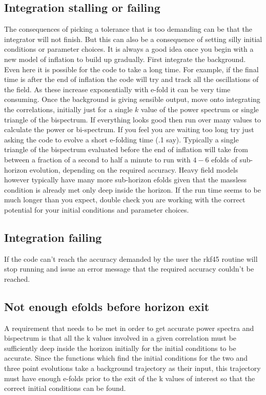 \documentclass[10pt,
amsmath,amssymb,
aps,prd,nofootinbib,eqsecnum,a4paper]{revtex4}
\begin{document}
\subsection{Integration stalling or failing} 

The consequences of picking a tolerance that is too demanding can be that the integrator will not finish. 
But this can also be a consequence of setting silly initial conditions or parameter choices. It is always a good idea 
once you begin with a new model of inflation to build up gradually. First integrate the background. Even here it 
is possible for the code to take a long time. For example, if the final time is after the end of inflation the code will 
try and  track all the oscillations of the field. As these increase exponentially with e-fold it 
can be very time consuming. 
Once the background is giving sensible output, move onto integrating the correlations, 
initially just for a 
single $k$ value of the power spectrum or single triangle of the bispectrum. If 
everything looks good then run over many values to calculate the power or bi-spectrum. If you feel you are waiting too long try just asking 
the code to evolve 
a short e-folding time (.1 say). Typically a single triangle of the bispectrum evaluated before the end of 
inflation will take 
from between a fraction of a second to half a minute to run with $4-6$ efolds of 
sub-horizon evolution, depending on the required accuracy. Heavy field models however typically have many more sub-horizon efolds given that the massless condition is already met only deep inside the horizon.  If the run time seems to be much longer than you expect, double check 
you are working  
with the correct potential for your initial conditions and parameter choices.

\subsection{Integration failing}

If the code can't reach the accuracy demanded by the user the rkf45 routine will stop running and issue an error 
message that the required accuracy couldn't be reached. 

\subsection{Not enough efolds before horizon exit}

A requirement that needs to be met in order to get accurate power spectra and bispectrum is that all the k values 
involved in a given correlation must be sufficiently deep inside the horizon initially for the 
initial conditions to be accurate. Since the functions which find the initial conditions for the two and three point evolutions take a background 
trajectory as their input, this trajectory must have enough e-folds prior to the exit of the k values of 
interest so that the correct initial conditions can be found. 
\end{document}
